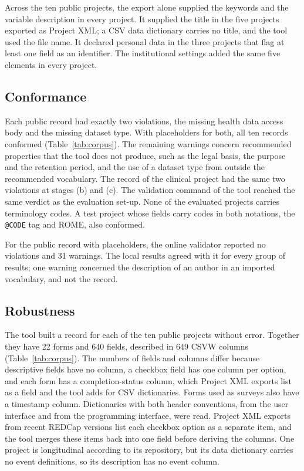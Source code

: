 \documentclass[12pt]{article}
\newcommand{\code}[1]{\texttt{#1}}
\begin{document}
Across the ten public projects, the export alone supplied the keywords and the variable
description in every project. It supplied the title in the five projects exported as
Project XML; a CSV data dictionary carries no title, and the tool used the file name.
It declared personal data in the three projects that flag at least one field as an
identifier. The institutional settings added the same five elements in every project.

\subsection{Conformance}

Each public record had exactly two violations, the missing health data
access body and the missing dataset type. With placeholders for both, all ten records
conformed (Table~\ref{tab:corpus}). The remaining warnings concern recommended properties
that the tool does not produce, such as the legal basis, the purpose and the retention
period, and the use of a dataset type from outside the recommended vocabulary. The
record of the clinical project had the same two violations at stages (b) and (c). The validation command of the tool reached the same verdict as the evaluation set-up.
None of the evaluated projects carries terminology codes. A test project whose fields
carry codes in both notations, the \code{@CODE} tag and ROME, also conformed.

For the public record with placeholders, the online validator reported no violations and
31 warnings. The local results agreed with it for every group of results; one warning
concerned the description of an author in an imported vocabulary, and not the record.


\subsection{Robustness}

The tool built a record for each of the ten public projects without error. Together they
have 22 forms and 640 fields, described in 649 CSVW columns (Table~\ref{tab:corpus}).
The numbers of fields and columns differ because descriptive fields have no column, a
checkbox field has one column per option, and each form has a completion-status column,
which Project XML exports list as a field and the tool adds for CSV dictionaries. Forms
used as surveys also have a timestamp column. Dictionaries with both header conventions, from the user interface and from the
programming interface, were read. Project XML exports from recent REDCap versions list each checkbox
option as a separate item, and the tool merges these items back into one field before
deriving the columns. One project is
longitudinal according to its repository, but its data dictionary carries no event
definitions, so its description has no event column.
\end{document}
